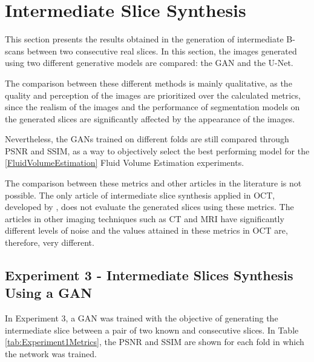 \section{Intermediate Slice Synthesis}\label{IntermediateSliceSynthesis}

This section presents the results obtained in the generation of intermediate B-scans between two consecutive real slices. In this section, the images generated using two different generative models are compared: the GAN and the U-Net.
\par
The comparison between these different methods is mainly qualitative, as the quality and perception of the images are prioritized over the calculated metrics, since the realism of the images and the performance of segmentation models on the generated slices are significantly affected by the appearance of the images.
\par
Nevertheless, the GANs trained on different folds are still compared through PSNR and SSIM, as a way to objectively select the best performing model for the \ref{FluidVolumeEstimation} Fluid Volume Estimation experiments.
\par
The comparison between these metrics and other articles in the literature is not possible. The only article of intermediate slice synthesis applied in OCT, developed by \textcite{Lopez2023}, does not evaluate the generated slices using these metrics. The articles in other imaging techniques such as CT and MRI have significantly different levels of noise and the values attained in these metrics in OCT are, therefore, very different.

\subsection{Experiment 3 - Intermediate Slices Synthesis Using a GAN}

In Experiment 3, a GAN was trained with the objective of generating the intermediate slice between a pair of two known and consecutive slices. In Table \ref{tab:Experiment1Metrics}, the PSNR and SSIM are shown for each fold in which the network was trained.

